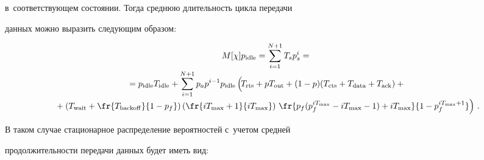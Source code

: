 в~соответствующем состоянии. Тогда среднюю длительность цикла передачи 


данных можно выразить следующим образом:





\vspace*{-6pt}





\noindent


\begin{multline*}


M[\chi]p_{\mathrm{idle}}=\sum\limits_{i=1}^{N+1} T_s p_s^i ={}\\[-2pt]


{}=p_{\mathrm{idle}}T_{\mathrm{idle}} +\sum\limits_{i=1}^{N+1} 


p_a p^{i-1}p_{\mathrm{idle}} \left(\!


\vphantom{\fr{p_f(p_f^{iT_{\max}+1} -iT_{\max} -1)+iT_{\max}} {1-p_f^{T_{\max}+1}}}


 T_{\mathrm{rts}} +pT_{\mathrm{out}} +(1-p) (T_{\mathrm{cts}}+T_{\mathrm{data}}+T_{\mathrm{ack}}) +{}\right.\\[-2pt]


\left.{}+\left( 


T_{\mathrm{wait}}+\fr{T_{\mathrm{backoff}}}{1-p_f}\right) \left( \fr{iT_{\max}+1}{iT_{\max}}\right) 


\,\fr{p_f(p_f^{iT_{\max}} -iT_{\max} -1)+iT_{\max}} {1-p_f^{iT_{\max}+1}} 


\right)\,.


\end{multline*}


%


В таком случае стационарное распределение вероятностей с~учетом средней 


продолжительности передачи данных будет иметь вид:


